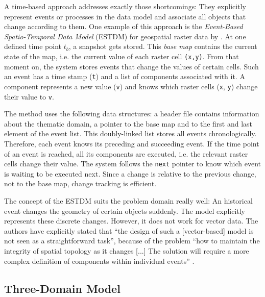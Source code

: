 A time-based approach addresses exactly those shortcomings: They explicitly represent events or processes in the data model and associate all objects that change according to them. One example of this approach is the \emph{Event-Based Spatio-Temporal Data Model} (ESTDM) for geospatial raster data by
\cite{peuquet95}. At one defined time point $t_b$, a snapshot gets stored. This \emph{base map} contains the current state of the map, i.e. the current value of each raster cell \texttt{(x,y)}. From that moment on, the system stores events that change the values of certain cells. Such an event has a time stamp (\texttt{t}) and a list of components associated with it. A component represents a new value (\texttt{v}) and knows which raster cells (\texttt{x}, \texttt{y}) change their value to \texttt{v}.

The method uses the following data structures: a header file contains information about the thematic domain, a pointer to the base map and to the first and last element of the event list. This doubly-linked list stores all events chronologically. Therefore, each event knows its preceding and succeeding event. If the time point of an event is reached, all its components are executed, i.e. the relevant raster cells change their value. The system follows the \texttt{next} pointer to know which event is waiting to be executed next. Since a change is relative to the previous change, not to the base map, change tracking is efficient.

The concept of the ESTDM suits the problem domain really well: An historical event changes the geometry of certain objects suddenly. The model explicitly represents these discrete changes. However, it does not work for vector data. The authors have explicitly stated that ``the design of such a [vector-based] model is not seen as a straightforward task'', because of the problem ``how to maintain the integrity of spatial topology as it changes [...] The solution will require a more complex definition of components within individual events''
\cite[p. 21]{peuquet95}.



\subsection{Three-Domain Model} %
\label{sub:three_domain_model}


